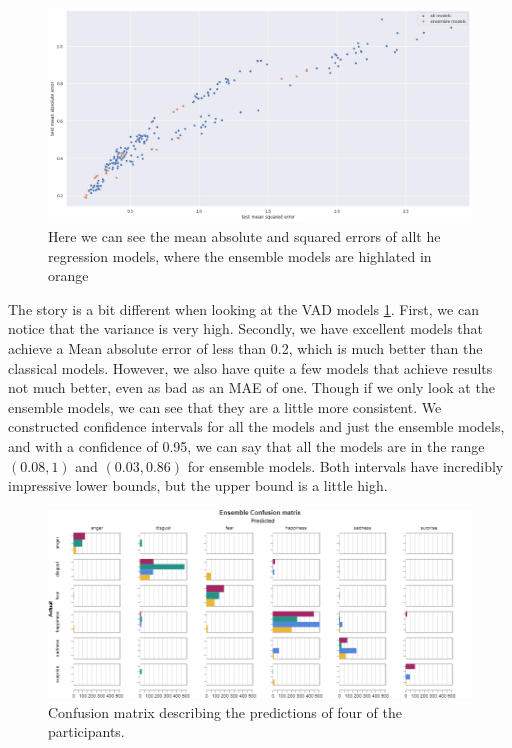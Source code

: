 \documentclass[../main.tex]{subfiles}
\begin{document}
    \begin{figure}[!htp]
        \centering
        \includegraphics[width=14cm]{figures/results/nn_err}   
        \caption{Here we can see the mean absolute and squared errors of allt he regression models, where the ensemble models are highlated in orange}
        \label{fig:nn_err} 
    \end{figure}


    The story is a bit different when looking at the VAD models \ref{fig:nn_err}. First, we can notice that the variance is very high. 
    Secondly, we have excellent models that achieve a Mean absolute error of less than 0.2, which is much better than the classical models. However, 
    we also have quite a few models that achieve results not much better, even as bad as an MAE of one. Though if we only look at the ensemble models, 
    we can see that they are a little more consistent. We constructed confidence intervals for all the models and just the ensemble models, 
    and with a confidence of 0.95, we can say that all the models are in the range $(0.08, 1)$ and $(0.03, 0.86)$ for ensemble models. Both intervals 
    have incredibly impressive lower bounds, but the upper bound is a little high. 

    \begin{figure}[!htp]
        \centering
        \includegraphics[width=14cm]{figures/results/nn_ensemble_cm}   
        \caption{Confusion matrix describing the predictions of four of the participants.}
        \label{fig:nn_ensemble_cm} 
    \end{figure}
\end{document}

